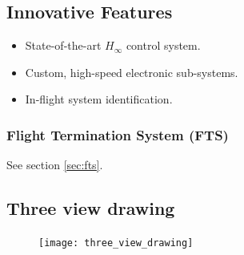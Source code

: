 \subsection{Innovative Features}
\begin{itemize}
	\item State-of-the-art $H_{\infty}$ control system.
	\item Custom, high-speed electronic sub-systems.
	\item In-flight system identification.
\end{itemize}

\subsubsection{Flight Termination System (FTS)}
See section \ref{sec:fts}.

\subsection{Three view drawing}
\vspace*{-0.4cm}
\begin{figure}[H]
	\centering
	\texttt{[image: three\_view\_drawing]}
\end{figure}
